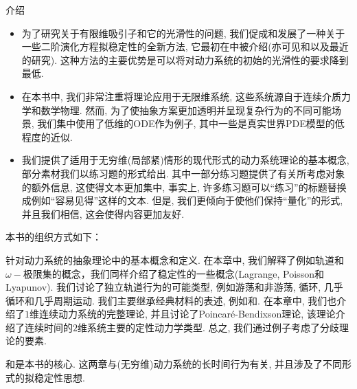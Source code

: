 \begin{PreChapter}{介\quad 绍}
\begin{itemize}
		\item 为了研究关于有限维吸引子和它的光滑性的问题, 我们促成和发展了一种关于一些二阶演化方程拟稳定性的全新方法, 它最初在\cite{Chueshov04}中被介绍(亦可见\cite{Chueshov08}和\cite{Chueshov10}以及最近的研究\cite{Chueshov13}). 这种方法的主要优势是可以将对动力系统的初始的光滑性的要求降到最低. 
		
		\item 在本书中, 我们非常注重将理论应用于无限维系统, 这些系统源自于连续介质力学和数学物理. 然而, 为了使抽象方案更加透明并呈现复杂行为的不同可能场景, 我们集中使用了低维的ODE作为例子, 其中一些是真实世界PDE模型的低程度的近似. 
		
		\item 我们提供了适用于无穷维(局部紧)情形的现代形式的动力系统理论的基本概念, 部分素材我们以练习题的形式给出. 其中一部分练习题提供了有关所考虑对象的额外信息, 这使得文本更加集中, 事实上, 许多练习题可以“练习”的标题替换成例如“容易见得”这样的文本. 但是, 我们更倾向于使他们保持“量化”的形式, 并且我们相信, 这会使得内容更加友好. 
	\end{itemize}

	本书的组织方式如下：
	
	针对动力系统的抽象理论中的基本概念和定义. 在本章中, 我们解释了例如轨道和$\omega-$极限集的概念，我们同样介绍了稳定性的一些概念(Lagrange, Poisson和Lyapunov). 我们讨论了独立轨道行为的可能类型, 例如游荡和非游荡, 循环, 几乎循环和几乎周期运动. 我们主要继承经典材料的表述, 例如\cite{Nemytskii60}和\cite{Sibirsky75}. 在本章中, 我们也介绍了$1$维连续动力系统的完整理论, 并且讨论了Poincaré-Bendixson理论, 该理论介绍了连续时间的$2$维系统主要的定性动力学类型. 总之, 我们通过例子考虑了分歧理论的要素. 
	
	和是本书的核心. 这两章与(无穷维)动力系统的长时间行为有关, 并且涉及了不同形式的拟稳定性思想. 

\end{PreChapter}